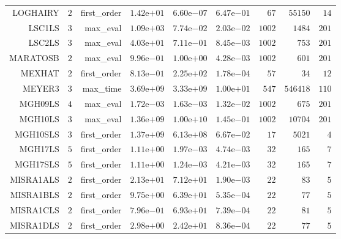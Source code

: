 \begin{longtable}{rrrrrrrrr}
LOGHAIRY & \(     2\) & first\_order & \( 1.42\)e\(+01\) & \( 6.60\)e\(-07\) & \( 6.47\)e\(-01\) & \(    67\) & \( 55150\) & \(    14\) \\
LSC1LS & \(     3\) & max\_eval & \( 1.09\)e\(+03\) & \( 7.74\)e\(-02\) & \( 2.03\)e\(-02\) & \(  1002\) & \(  1484\) & \(   201\) \\
LSC2LS & \(     3\) & max\_eval & \( 4.03\)e\(+01\) & \( 7.11\)e\(-01\) & \( 8.45\)e\(-03\) & \(  1002\) & \(   753\) & \(   201\) \\
MARATOSB & \(     2\) & max\_eval & \( 9.96\)e\(-01\) & \( 1.00\)e\(+00\) & \( 4.28\)e\(-03\) & \(  1002\) & \(   601\) & \(   201\) \\
MEXHAT & \(     2\) & first\_order & \( 8.13\)e\(-01\) & \( 2.25\)e\(+02\) & \( 1.78\)e\(-04\) & \(    57\) & \(    34\) & \(    12\) \\
MEYER3 & \(     3\) & max\_time & \( 3.69\)e\(+09\) & \( 3.33\)e\(+09\) & \( 1.00\)e\(+01\) & \(   547\) & \(546418\) & \(   110\) \\
MGH09LS & \(     4\) & max\_eval & \( 1.72\)e\(-03\) & \( 1.63\)e\(-03\) & \( 1.32\)e\(-02\) & \(  1002\) & \(   675\) & \(   201\) \\
MGH10LS & \(     3\) & max\_eval & \( 1.36\)e\(+09\) & \( 1.00\)e\(+10\) & \( 1.45\)e\(-01\) & \(  1002\) & \( 10704\) & \(   201\) \\
MGH10SLS & \(     3\) & first\_order & \( 1.37\)e\(+09\) & \( 6.13\)e\(+08\) & \( 6.67\)e\(-02\) & \(    17\) & \(  5021\) & \(     4\) \\
MGH17LS & \(     5\) & first\_order & \( 1.11\)e\(+00\) & \( 1.97\)e\(-03\) & \( 4.74\)e\(-03\) & \(    32\) & \(   165\) & \(     7\) \\
MGH17SLS & \(     5\) & first\_order & \( 1.11\)e\(+00\) & \( 1.24\)e\(-03\) & \( 4.21\)e\(-03\) & \(    32\) & \(   165\) & \(     7\) \\
MISRA1ALS & \(     2\) & first\_order & \( 2.13\)e\(+01\) & \( 7.12\)e\(+01\) & \( 1.90\)e\(-03\) & \(    22\) & \(    83\) & \(     5\) \\
MISRA1BLS & \(     2\) & first\_order & \( 9.75\)e\(+00\) & \( 6.39\)e\(+01\) & \( 5.35\)e\(-04\) & \(    22\) & \(    77\) & \(     5\) \\
MISRA1CLS & \(     2\) & first\_order & \( 7.96\)e\(-01\) & \( 6.93\)e\(+01\) & \( 7.39\)e\(-04\) & \(    22\) & \(    81\) & \(     5\) \\
MISRA1DLS & \(     2\) & first\_order & \( 2.98\)e\(+00\) & \( 2.42\)e\(+01\) & \( 8.36\)e\(-04\) & \(    22\) & \(    77\) & \(     5\) \\

\end{longtable}
